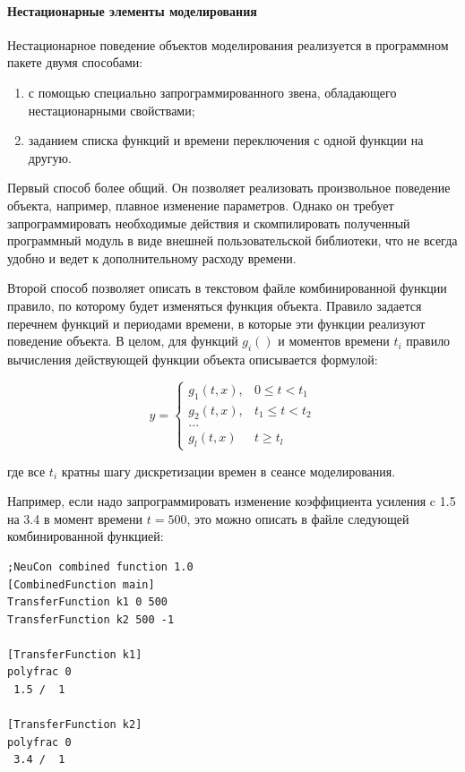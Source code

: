 \paragraph{Нестационарные элементы моделирования}

Нестационарное поведение объектов моделирования реализуется в
программном пакете двумя способами:
\begin{enumerate}
\item с помощью специально запрограммированного звена, обладающего
  нестационарными свойствами;
\item заданием списка функций и времени переключения с одной функции
  на другую.
\end{enumerate}

Первый способ более общий.  Он позволяет реализовать произвольное
поведение объекта, например, плавное изменение параметров.  Однако он
требует запрограммировать необходимые действия и скомпилировать
полученный программный модуль в виде внешней пользовательской
библиотеки, что не всегда удобно и ведет к дополнительному расходу
времени.

Второй способ позволяет описать в текстовом файле комбинированной
функции правило, по которому будет изменяться функция объекта.
Правило задается перечнем функций и периодами времени, в которые эти
функции реализуют поведение объекта.  В целом, для функций $g_i()$ и
моментов времени $t_i$ правило вычисления действующей функции объекта
описывается формулой:

$$
y=\left\{
\begin{array}{ll}
  g_1(t,x), & 0\le t < t_1\\
  g_2(t,x), & t_1\le t < t_2\\
  ... & \\
  g_l(t,x) & t \ge t_l
\end{array}\right.
$$

\noindent где все $t_i$ кратны шагу дискретизации времен в сеансе
моделирования.

Например, если надо запрограммировать изменение коэффициента усиления
c 1.5 на 3.4 в момент времени $t=500$, это можно описать в файле
следующей комбинированной функцией:

\begin{verbatim}
;NeuCon combined function 1.0
[CombinedFunction main]
TransferFunction k1 0 500
TransferFunction k2 500 -1

[TransferFunction k1]
polyfrac 0
 1.5 /  1

[TransferFunction k2]
polyfrac 0
 3.4 /  1
\end{verbatim}

